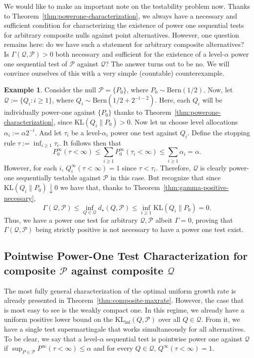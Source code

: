 \documentclass[11pt]{article}
\newcommand{\KL}{\mathrm{KL}}
\newcommand{\KLinf}{\mathrm{KL}_{\mathrm{inf}}}
\newcommand{\Pcal}{\mathcal{P}}
\newcommand{\Qcal}{\mathcal{Q}}
\theoremstyle{definition}
\newtheorem{example}[theorem]{Example}
\theoremstyle{definition}
\begin{document}
We would like to make an important note on the testability problem now. Thanks to Theorem~\ref{thm:powerone-characterization}, we always have a necessary and sufficient condition for characterizing the existence of power one sequential tests for arbitrary composite nulls against point alternatives. However, one question remains here: do we have such a statement for arbitrary composite alternatives? Is $\Gamma(\Qcal,\Pcal)>0$ both necessary and sufficient for the existence of a level-$\alpha$ power one sequential test of $\Pcal$ against $\Qcal$? The answer turns out to be no. We will convince ourselves of this with a very simple (countable) counterexample.

\begin{example}\label{ex:baby-breakiffseqbip}
Consider the null $\Pcal=\{P_0\}$, where $P_0\sim\mathrm{Bern}(1/2)$. Now, let $\Qcal:=\{Q_i: i\ge 1\}$, where $Q_i\sim\mathrm{Bern}(1/2 + 2^{-i-2})$. Here, each $Q_i$ will be individually power-one against $\{P_0\}$ thanks to Theorem~\ref{thm:powerone-characterization}, since $\KL(Q_i\|P_0)>0$. Now let us choose level allocations $\alpha_i:=\alpha 2^{-i}$. And let $\tau_i$ be a level-$\alpha_i$ power one test against $Q_i$. Define the stopping rule $\tau:=\inf_{i\ge 1}\tau_i$. It follows then that
\[
P_0^{\infty}(\tau<\infty)\le \sum_{i\ge 1} P_0^{\infty}(\tau_i<\infty)\le \sum_{i\ge1}\alpha_i=\alpha.
\]
However, for each $i$, $Q_i^{\infty}(\tau<\infty)=1$ since $\tau<\tau_i$. Therefore, $\Qcal$ is clearly power-one sequentially testable against $\Pcal$ in this case. But recognize that since $\KL(Q_i\|P_0)\downarrow 0$ we have that, thanks to Theorem~\ref{thm:gamma-positive-necessary},
\[
\Gamma(\Qcal,\Pcal)\le \inf_{Q\in\Qcal} d_{\star} (Q,\Pcal)\le \inf_{i\ge 1}\KL(Q_i\|P_0)=0.
\]
Thus, we have a power one test for arbitrary $\Qcal,\Pcal$ albeit $\Gamma=0$, proving that $\Gamma(\Qcal,\Pcal)$ being strictly positive is not necessary to have a power one test exist. 
\end{example}

\subsection{Pointwise Power-One Test Characterization for composite $\Pcal$ against composite $\Qcal$}

The most fully general characterization of the optimal uniform growth rate is already presented in Theorem~\ref{thm:composite-maxrate}. However, the case that is most easy to see is the weakly compact one. In this regime, we already have a uniform positive lower bound on the $\KLinf(Q,\Pcal)$ over all $Q\in\Qcal$. From it, we have a single test supermartingale that works simultaneously for all alternatives. To be clear, we say that a level-$\alpha$ sequential test is pointwise power one against $\Qcal$ if $\sup_{P\in\Pcal}P^{\infty}(\tau<\infty)\le \alpha$ and for every $Q\in\Qcal$, $Q^{\infty}(\tau<\infty)=1$.
\end{document}
